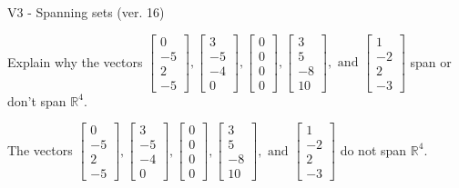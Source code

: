 \begin{exercise}
  \begin{exerciseTitle}V3 - Spanning sets (ver. 16)\end{exerciseTitle}
  \begin{exerciseStatement}
    Explain why the vectors \(\left[\begin{array}{r}
0 \\
-5 \\
2 \\
-5
\end{array}\right] , \left[\begin{array}{r}
3 \\
-5 \\
-4 \\
0
\end{array}\right] , \left[\begin{array}{r}
0 \\
0 \\
0 \\
0
\end{array}\right] , \left[\begin{array}{r}
3 \\
5 \\
-8 \\
10
\end{array}\right] , \text{ and } \left[\begin{array}{r}
1 \\
-2 \\
2 \\
-3
\end{array}\right]\) span or don't span \(\mathbb{R}^4\). 
	


  \end{exerciseStatement}
  \begin{exerciseAnswer}
   The vectors \(\left[\begin{array}{r}
0 \\
-5 \\
2 \\
-5
\end{array}\right] , \left[\begin{array}{r}
3 \\
-5 \\
-4 \\
0
\end{array}\right] , \left[\begin{array}{r}
0 \\
0 \\
0 \\
0
\end{array}\right] , \left[\begin{array}{r}
3 \\
5 \\
-8 \\
10
\end{array}\right] , \text{ and } \left[\begin{array}{r}
1 \\
-2 \\
2 \\
-3
\end{array}\right]\) 
  	 do not  
	span \(\mathbb{R}^4\).
  



\end{exerciseAnswer}
\end{exercise}
